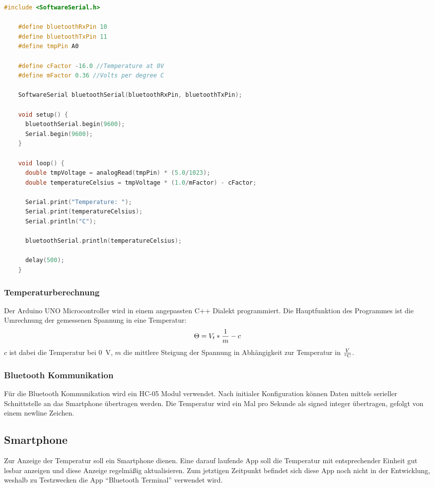 \documentclass{article}
\begin{document}
    \begin{lstlisting}[language=C++, caption={Arduino code}]
    #include <SoftwareSerial.h>

    #define bluetoothRxPin 10
    #define bluetoothTxPin 11
    #define tmpPin A0

    #define cFactor -16.0 //Temperature at 0V
    #define mFactor 0.36 //Volts per degree C

    SoftwareSerial bluetoothSerial(bluetoothRxPin, bluetoothTxPin);

    void setup() {
      bluetoothSerial.begin(9600);
      Serial.begin(9600);
    }

    void loop() {
      double tmpVoltage = analogRead(tmpPin) * (5.0/1023);
      double temperatureCelsius = tmpVoltage * (1.0/mFactor) - cFactor;

      Serial.print("Temperature: ");
      Serial.print(temperatureCelsius);
      Serial.println("C");

      bluetoothSerial.println(temperatureCelsius);

      delay(500);
    }
    \end{lstlisting}

    \subsubsection{Temperaturberechnung}
      Der Arduino UNO Microcontroller wird in einem angepassten C++ Dialekt
      programmiert. Die Hauptfunktion des Programmes ist die Umrechnung der gemessenen
      Spannung in eine Temperatur:
      \[
      \Theta = V_{t} * {1 \over m} - c
      \]
      $c$ ist dabei die Temperatur bei \SI{0}{\volt}, $m$ die mittlere Steigung der
      Spannung in Abhängigkeit zur Temperatur in $V \over \si{\degreeCelsius}$.

    \subsubsection{Bluetooth Kommunikation}
      Für die Bluetooth Kommunikation wird ein HC-05 Modul verwendet. Nach
      initialer Konfiguration können Daten mittels serieller Schnittstelle an das
      Smartphone übertragen werden. Die Temperatur wird ein Mal pro Sekunde als
      signed integer übertragen, gefolgt von einem newline Zeichen.

  \subsection{Smartphone}
    Zur Anzeige der Temperatur soll ein Smartphone dienen. Eine darauf laufende
    App soll die Temperatur mit entsprechender Einheit gut lesbar anzeigen und
    diese Anzeige regelmäßig aktualisieren. Zum jetztigen Zeitpunkt befindet
    sich diese App noch nicht in der Entwicklung, weshalb zu Testzwecken die App
    \enquote{Bluetooth Terminal} \cite{bluetoothTerminal} verwendet wird.
\end{document}

